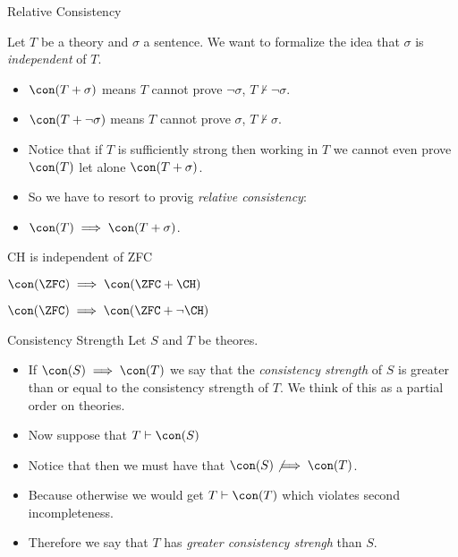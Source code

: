 \documentclass{beamer}
\begin{document}
\begin{frame}{Relative Consistency}

Let $T$ be a theory and $\sigma$ a sentence. We want to formalize the
idea that $\sigma$ is \emph{independent} of $T$.

\begin{itemize}
\item $\con(T + \sigma)$ means $T$ cannot prove $\neg\sigma$, $T\not\vdash\neg\sigma$.
\item $\con(T + \neg\sigma)$ means $T$ cannot prove $\sigma$, $T\not\vdash\sigma$.
\item Notice that if $T$ is sufficiently strong then working in $T$ we
cannot even prove $\con(T)$ let alone $\con(T + \sigma)$.
\item So we have to resort to provig \emph{relative consistency}:
\item $\con(T) \implies \con(T + \sigma)$.
\end{itemize}

\end{frame}

\begin{frame}{CH is independent of ZFC}

\begin{theorem}[G\"{o}del, 1938]
$\con(\ZFC) \implies \con(\ZFC + \CH)$
\end{theorem}

\begin{theorem}[Cohen, 1963]
$\con(\ZFC) \implies \con(\ZFC + \neg\CH)$
\end{theorem}

\end{frame}

\begin{frame}{Consistency Strength}
Let $S$ and $T$ be theores.
\begin{itemize}
\item If $\con(S) \implies \con(T)$ we say that the \emph{consistency strength}
of $S$ is greater than or equal to the consistency strength of $T$. We think
of this as a partial order on theories.
\item Now suppose that $T\vdash\con(S)$
\item Notice that then we must have that $\con(S) \not\implies \con(T)$.
\item Because otherwise we would get $T\vdash\con(T)$ which violates second
incompleteness.
\item Therefore we say that $T$ has
\emph{greater consistency strengh} than $S$.
\end{itemize}
\end{frame}
\end{document}
